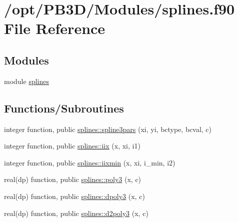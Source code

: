\hypertarget{splines_8f90}{}\section{/opt/\+P\+B3\+D/\+Modules/splines.f90 File Reference}
\label{splines_8f90}
\subsection*{Modules}
\begin{DoxyCompactItemize}
\item 
module \hyperlink{namespacesplines}{splines}
\end{DoxyCompactItemize}
\subsection*{Functions/\+Subroutines}
\begin{DoxyCompactItemize}
\item 
integer function, public \hyperlink{namespacesplines_a05f420f0b3b0106002e125873e32f9f8}{splines\+::spline3pars} (xi, yi, bctype, bcval, c)
\item 
integer function, public \hyperlink{namespacesplines_a0f964b42918aebb07ea640368240d3b3}{splines\+::iix} (x, xi, i1)
\item 
integer function, public \hyperlink{namespacesplines_a150ebea82fdfc65f1928d6c8d0a249d5}{splines\+::iixmin} (x, xi, i\+\_\+min, i2)
\item 
real(dp) function, public \hyperlink{namespacesplines_ac73e6ec2345cfda7cfa18da6c24be86d}{splines\+::poly3} (x, c)
\item 
real(dp) function, public \hyperlink{namespacesplines_a61a0713641022429d90d94dbc683d16c}{splines\+::dpoly3} (x, c)
\item 
real(dp) function, public \hyperlink{namespacesplines_a3c279dd01641afa904c481492a43fa39}{splines\+::d2poly3} (x, c)
\end{DoxyCompactItemize}
